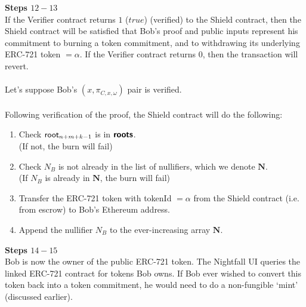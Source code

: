\textbf{Steps $12 - 13$}
\ \\
If the Verifier contract returns $1$ ($true$) (verified) to the Shield contract, then the Shield contract will be satisfied that Bob's proof and public inputs represent his commitment to burning a token commitment, and to withdrawing its underlying ERC-721 token $=\alpha$. If the Verifier contract returns $0$, then the transaction will revert.\\
\\
Let's suppose Bob's $(x, \pi_{C,x,\omega})$ pair is verified.\\
\\
Following verification of the proof, the Shield contract will do the following:
\begin{enumerate}
  \item Check $\mathsf{root}_{n+m+k-1}$ is in $\bm{\mathsf{roots}}$.\\
    (If not, the burn will fail)
  \item Check $N_B$ is not already in the list of nullifiers, which we denote $\bm{N}$.\\
    (If $N_B$ is already in $\bm{N}$, the burn will fail)
  \item Transfer the ERC-721 token with tokenId $=\alpha$ from the Shield     contract (i.e. from escrow) to Bob's Ethereum address.
  \item Append the nullifier $N_{B}$ to the ever-increasing array $\bm N$.
\end{enumerate}


\textbf{Steps $14 - 15$}
\ \\
Bob is now the owner of the public ERC-721 token. The Nightfall UI queries the linked ERC-721 contract for tokens Bob owns.
If Bob ever wished to convert this token back into a token commitment, he would need to do a non-fungible `mint' (discussed earlier).
